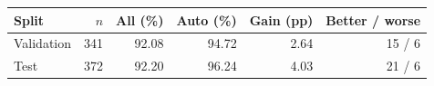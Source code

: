 \begin{tabular}{@{}lrrrrr@{}}
\toprule
\textbf{Split} & \textbf{$n$} & \textbf{All (\%)} & \textbf{Auto (\%)} & \textbf{Gain (pp)} & \textbf{Better / worse} \\ \midrule
Validation & 341 & 92.08 & 94.72 & 2.64 & 15 / 6 \\
Test & 372 & 92.20 & 96.24 & 4.03 & 21 / 6 \\
\bottomrule
\end{tabular}

